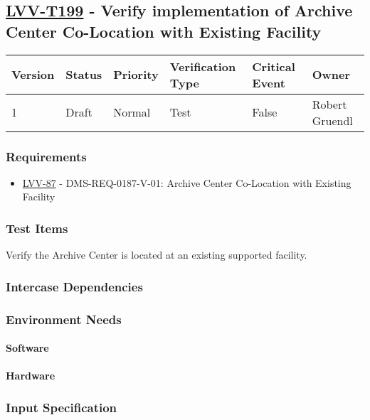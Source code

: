 \subsection{\href{https://jira.lsstcorp.org/secure/Tests.jspa\#/testCase/LVV-T199}{LVV-T199}
    - Verify implementation of Archive Center Co-Location with Existing Facility}\label{lvv-t199}

\begin{longtable}[]{llllll}
\toprule
Version & Status & Priority & Verification Type & Critical Event & Owner
\\\midrule
1 & Draft & Normal &
Test & False & Robert Gruendl
\\\bottomrule
\end{longtable}

\subsubsection{Requirements}
\begin{itemize}
\item \href{https://jira.lsstcorp.org/browse/LVV-87}{LVV-87} - DMS-REQ-0187-V-01: Archive Center Co-Location with Existing Facility
\end{itemize}

\subsubsection{Test Items}
Verify the Archive Center is located at an existing supported facility.



\subsubsection{Intercase Dependencies}

\subsubsection{Environment Needs}

\paragraph{Software}

\paragraph{Hardware}

\subsubsection{Input Specification}

